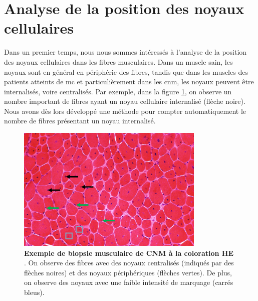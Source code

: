 \section{Analyse de la position des noyaux cellulaires}
Dans un premier temps, nous nous sommes intéressés à l'analyse de la position des noyaux cellulaires dans les fibres musculaires. Dans un muscle sain, les noyaux sont en général en périphérie des fibres, tandis que dans les muscles des patients atteints de \gls{mc} et particulièrement dans les \gls{cnm}, les noyaux peuvent être internalisés, voire centralisés. Par exemple, dans la figure \ref{fig:he_example}, on observe un nombre important de fibres ayant un noyau cellulaire internalisé (flèche noire). Nous avons dès lors développé une méthode pour compter automatiquement le nombre de fibres présentant un noyau internalisé.
\begin{figure}[!ht]
 \centering
 \includegraphics[width=0.8\textwidth]{figures/he_example.jpg}
 \caption[Exemple de biopsie musculaire à la coloration HE]{\textbf{Exemple de biopsie musculaire de CNM à la coloration HE }. On observe des fibres avec des noyaux centralisés (indiqués par des flèches noires) et des noyaux périphériques (flèches vertes). De plus, on observe des noyaux avec une faible intensité de marquage (carrés bleus).}
 \label{fig:he_example}
\end{figure}

